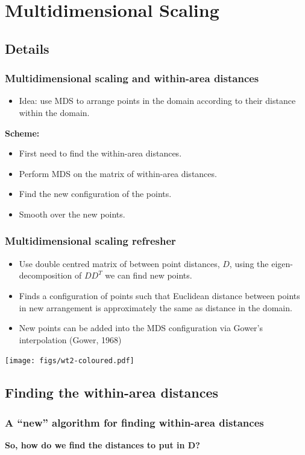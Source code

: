 \documentclass[ignorenonframetext]{beamer} %
\newcommand{\bc}{\begin{center}}
\newcommand{\ec}{\end{center}}
\newcommand{\bi}{\begin{itemize}}
\newcommand{\ei}{\end{itemize}}
\begin{document}
\section{Multidimensional Scaling}

\subsection{Details}

\begin{frame}
	\frametitle{Multidimensional scaling and within-area distances}
       \bi
         \item Idea: use MDS to arrange points in the domain according to their distance within the domain.
         \ei
         \bc \textbf{Scheme:} \ec
         \bi
         \item First need to find the within-area distances.
         \item Perform MDS on the matrix of within-area distances.
         \item Find the new configuration of the points.
         \item Smooth over the new points.

        \ei
\end{frame}

\begin{frame}
	\frametitle{Multidimensional scaling refresher}
       \bi
         \item Use double centred matrix of between point distances, $D$, using the eigen-decomposition of $DD^T$ we can find new points.
         \item Finds a configuration of points such that Euclidean distance between points in new arrangement is approximately the same as distance in the domain.
          \item New points can be added into the MDS configuration via Gower's interpolation (Gower, 1968)
        \ei
            \centering
              \texttt{[image: figs/wt2-coloured.pdf]}\\
        
\end{frame}

\subsection{Finding the within-area distances}

\begin{frame}
	\frametitle{A ``new'' algorithm for finding within-area distances}

	\bc \textbf{So, how do we find the distances to put in D?}\ec
\end{frame}
\end{document}
